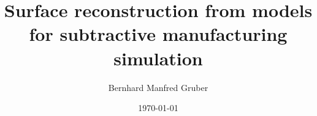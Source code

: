 \documentclass[
a4paper,
draft,
]
{scrreprt}
\begin{document}

\title{Surface reconstruction from models for subtractive manufacturing simulation} %
\author{Bernhard Manfred Gruber}
\date{\today}



\setcounter{page}{2} %





\begin{spacing}{0.95}
	\tableofcontents
\end{spacing}
\clearpage

















\listoffigures

\listoftables

\listofalgorithms

\setcounter{biburllcpenalty}{7000}
\setcounter{biburlucpenalty}{8000}
\printbibliography[title=References]
\end{document}
